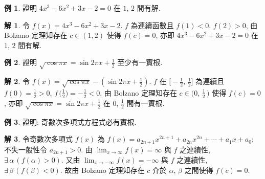 \documentclass[12pt]{extarticle}
\newcommand{\ds}{\displaystyle}
\theoremstyle{definition}
\newtheorem*{ex}{例}
\newtheorem*{sol}{解}
\begin{document}
\begin{ex}
  證明 $4x^3 - 6x^2 + 3x - 2 = 0$ 在 $1$, $2$ 間有解. 
\end{ex}

\begin{sol}
  令 $f(x) = 4x^3 - 6x^2 + 3x - 2$. $f$ 為連續函數且 $f(1) < 0$, $f(2) > 0$, 由 Bolzano 定理知存在 $c\in(1, 2)$ 使得 $f(c) = 0$, 亦即 $4x^3 - 6x^2 + 3x - 2 = 0$ 在 $1$, $2$ 間有解. 
\end{sol}

\begin{ex}
  證明 $\ds\sqrt{\cos\pi x} = \sin 2\pi x + \frac{1}{2}$ 至少有一實根. 
\end{ex}

\begin{sol}
  令 $\ds f(x) = \sqrt{\cos\pi x} - (\sin 2\pi x + \frac{1}{2})$. $f$ 在 $\ds\Big[-\frac{1}{2},\,\frac{1}{2}\Big]$ 為連續且 $\ds f(0) = \frac{1}{2} > 0$, $\ds f\,\bigg(\frac{1}{2}\bigg) = -\frac{1}{2} < 0$, 由 Bolzano 定理知存在 $\ds c\in\Big(0,\,\frac{1}{2}\,\Big)$ 使得 $f(c) = 0$, 亦即 $\ds\sqrt{\cos\pi x} = \sin 2\pi x + \frac{1}{2}$ 在 $\ds 0$, $\ds\frac{1}{2}$ 間有一實根. 
\end{sol}

\begin{ex}
  證明: 奇數次多項式方程式必有實根. 
\end{ex}

\begin{sol}
  令奇數次多項式 $f(x)$ 為 $\ds f(x) = a_{2n + 1}x^{2n + 1} + a_{2n}x^{2n} + \cdots + a_1 x + a_0$; 不失一般性令 $a_{2n + 1} > 0$. 由 $\ds\lim_{x\to\infty}f(x) = \infty$ 與 $f$ 之連續性, $\exists\,\alpha\,(f(\alpha) > 0)$. 又由 $\ds\lim_{x\to-\infty}f(x) = -\infty$ 與 $f$ 之連續性, $\exists\,\beta\,(f(\beta) < 0)$. 故由 Bolzano 定理知存在 $c$ 介於 $\alpha$, $\beta$ 之間使得 $f(c) = 0$.  
\end{sol}

%
\end{document}
